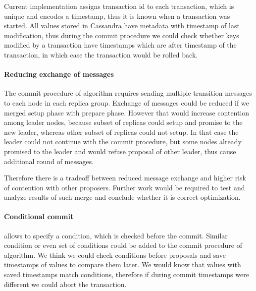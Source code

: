 Current implementation assigns transaction id to each transaction, which is unique and encodes a timestamp, thus it is known when a transaction was started. All values stored in Cassandra have metadata with timestamp of last modification, thus during the commit procedure we could check whether keys modified by a transaction have timestamps which are after timestamp of the transaction, in which case the transaction would be rolled back.

\paragraph{Reducing exchange of messages}
The commit procedure of \mpt algorithm requires sending multiple transition messages to each node in each replica group. Exchange of messages could be reduced if we merged setup phase with prepare phase. However that would increase contention among leader nodes, because subset of replicas could setup and promise to the new leader, whereas other subset of replicas could not setup.  In that case the leader could not continue with the commit procedure, but some nodes already promised to the leader and would refuse proposal of other leader, thus cause additional round of messages. 

Therefore there is a tradeoff between reduced message exchange and higher risk of contention with other proposers. Further work would be required to test and analyze results of such merge and conclude whether it is correct optimization.


\paragraph{Conditional commit}
\lwt allows to specify a condition, which is checked before the commit. Similar condition or even set of conditions could be added to the commit procedure of \mpt algorithm. We think we could check conditions before proposals and save timestamps of values to compare them later. We would know that values with saved timestamps match conditions, therefore if during commit timestamps were different we could abort the transaction.

